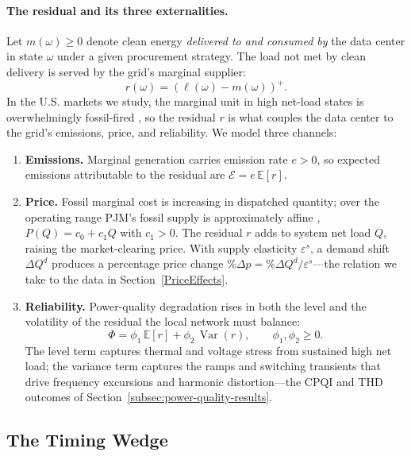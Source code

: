 \documentclass[a4paper,fleqn,longmktitle]{cas-sc}
\theoremstyle{plain}
\theoremstyle{definition}
\newcommand{\E}{\mathbb{E}}
\newcommand{\Var}{\operatorname{Var}}
\newcommand{\pos}[1]{\left(#1\right)^{+}}
\begin{document}
\paragraph{The residual and its three externalities.} Let $m(\omega)\ge 0$ denote clean energy \emph{delivered to and consumed by} the data center in state $\omega$ under a given procurement strategy. The load not met by clean delivery is served by the grid's marginal supplier:
\begin{equation}
    r(\omega)=\pos{\ell(\omega)-m(\omega)}.
\end{equation}
In the U.S. markets we study, the marginal unit in high net-load states is overwhelmingly fossil-fired \citep{cmu2025,PJM_DataMiner2_2025}, so the residual $r$ is what couples the data center to the grid's emissions, price, and reliability. We model three channels:
\begin{enumerate}
    \item \textbf{Emissions.} Marginal generation carries emission rate $e>0$, so expected emissions attributable to the residual are $\mathcal{E}=e\,\E[r]$.
    \item \textbf{Price.} Fossil marginal cost is increasing in dispatched quantity; over the operating range PJM's fossil supply is approximately affine \citep{PJM_DataMiner2_2025}, $P(Q)=c_0+c_1 Q$ with $c_1>0$. The residual $r$ adds to system net load $Q$, raising the market-clearing price. With supply elasticity $\varepsilon^s$, a demand shift $\Delta Q^d$ produces a percentage price change $\%\Delta p=\%\Delta Q^d/\varepsilon^s$---the relation we take to the data in Section~\ref{PriceEffects}.
    \item \textbf{Reliability.} Power-quality degradation rises in both the level and the volatility of the residual the local network must balance:
    \begin{equation}
        \Phi=\phi_1\,\E[r]+\phi_2\,\Var(r),\qquad \phi_1,\phi_2\ge 0.
        \label{eq:reliability}
    \end{equation}
    The level term captures thermal and voltage stress from sustained high net load; the variance term captures the ramps and switching transients that drive frequency excursions and harmonic distortion---the CPQI and THD outcomes of Section~\ref{subsec:power-quality-results}.
\end{enumerate}

\subsection{The Timing Wedge}\label{subsec:wedge}
\end{document}
